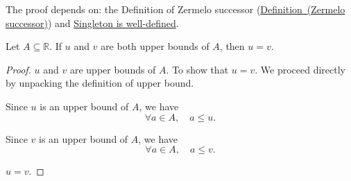 \begin{remark*}[Dependencies]
The proof depends on: the Definition of Zermelo successor
(\hyperref[def:zermelo-successor]{Definition~(Zermelo successor)}) and
\hyperref[prop:singleton-well-defined]{Singleton is well-defined}.
\end{remark*}









\begin{theorem}
Let $A \subseteq \mathbb{R}$.
If $u$ and $v$ are both upper bounds of $A$, then $u = v$.
\end{theorem}

\begin{proof}
\Given $u$ and $v$ are upper bounds of $A$.
\Goal To show that $u = v$.
\Strategy We proceed directly by unpacking the definition of upper bound.

\ByDef Since $u$ is an upper bound of $A$, we have
\[
\forall a \in A, \quad a \le u.
\] \tagDU

\ByDef Since $v$ is an upper bound of $A$, we have
\[
\forall a \in A, \quad a \le v.
\] \tagDU


\Hence $u = v$. \AsReq
\end{proof}